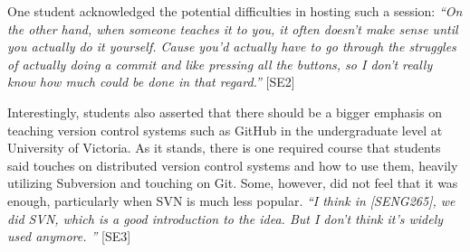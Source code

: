 

One student acknowledged the potential difficulties in hosting such a session: \textit{``On the other hand, when someone teaches it to you, it often doesn't make sense until you actually do it yourself. Cause you'd actually have to go through the struggles of actually doing a commit and like pressing all the buttons, so I don't really know how much could be done in that regard.''} [SE2]

Interestingly, students also asserted that there should be a bigger emphasis on teaching version control systems such as GitHub in the undergraduate level at University of Victoria. As it stands, there is one required course that students said touches on distributed version control systems and how to use them, heavily utilizing Subversion and touching on Git. Some, however, did not feel that it was enough, particularly when SVN is much less popular. \textit{``I think in [SENG265], we did SVN, which is a good introduction to the idea. But I don't think it's widely used anymore. ''} [SE3]



